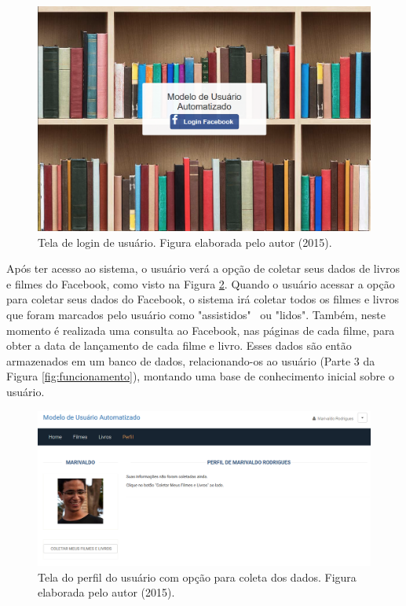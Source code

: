 \begin{figure}[H]
	\centering
	\includegraphics[scale=0.5]{imagens/sistema/login.png}
	\caption{Tela de login de usuário. Figura elaborada pelo autor (2015).}
	\label{fig:sis-login}
\end{figure}

Após ter acesso ao sistema, o usuário verá a opção de coletar seus dados de livros e filmes do Facebook, como visto na Figura \ref{fig:sis-coletar}. Quando o usuário acessar a opção para coletar seus dados do Facebook, o sistema irá coletar todos os filmes e livros que foram marcados pelo usuário como "assistidos"~ ou "lidos". Também, neste momento é realizada uma consulta ao Facebook, nas páginas de cada filme, para obter a data de lançamento de cada filme e livro. Esses dados são então armazenados em um banco de dados, relacionando-os ao usuário (Parte 3 da Figura \ref{fig:funcionamento}), montando uma base de conhecimento inicial sobre o usuário.

\begin{figure}
	\centering
	\includegraphics[scale=0.5]{imagens/sistema/usuario-coletar.png}
	\caption{Tela do perfil do usuário com opção para coleta dos dados. Figura elaborada pelo autor (2015).}
	\label{fig:sis-coletar}
\end{figure}

